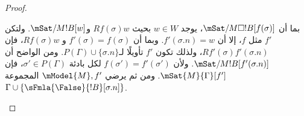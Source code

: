 \documentclass[../../../include/open-logic-section]{subfiles}
\begin{document}
\begin{proof}
\begin{enumerate}
{{  بما أن $\mSat/{M}{\Box !B}[f(\sigma)]$، يوجد $w \in W$ بحيث
  $Rf(\sigma)w$ و$\mSat/{M}{!B}[w]$. ولتكن $f'$ مثل $f$، إلا أن
  $f'(\sigma.n) = w$. وبما أن $f'(\sigma) = f(\sigma)$ و
  $Rf(\sigma)w$، فإن $Rf'(\sigma)f'(\sigma.n)$، ولذلك تكون $f'$
  تأويلًا لـ$P(\Gamma) \cup \{\sigma.n\}$. ومن الواضح أن
  $\mSat/{M}{!B}[f'(\sigma.n)]$. ولأن $f(\sigma') = f'(\sigma')$ لكل
  بادئة $\sigma' \in P(\Gamma)$، فإن $\mSat{M}{\Gamma}[f']$. ومن ثم
  يرضي $\mModel{M}, f'$ المجموعة $\Gamma \cup
  \{\sFmla{\False}{!B}[\sigma.n]\}$.}
  }{}

\end{enumerate}
\end{proof}
\end{document}

